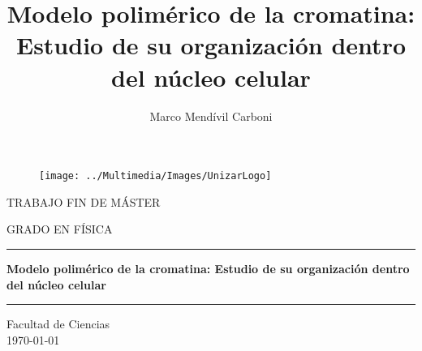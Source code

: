 \documentclass[a4paper,11pt]{report}
\title{Modelo polimérico de la cromatina: Estudio de su organización dentro del núcleo celular}
\author{Marco Mendívil Carboni}
\begin{document}
\renewcommand{\contentsname}{Índice}
\renewcommand{\tablename}{Tabla}
\renewcommand{\appendixname}{Anexo}


\begin{titlepage}

\vspace*{4mm}

\begin{figure}[h]
  \centering
  \texttt{[image: ../Multimedia/Images/UnizarLogo]}
\end{figure}

\vspace*{8mm}

\begin{center}
\Large TRABAJO FIN DE MÁSTER
\end{center}
\begin{center}
\Large GRADO EN FÍSICA
\end{center}

\vspace*{8mm}

\hrule

\vspace*{4mm}

\begin{center}
\huge\bf Modelo polimérico de la cromatina: Estudio de su organización dentro del núcleo celular
\end{center}

\vspace*{4mm}

\hrule

\vspace*{20mm}


\vspace*{8mm}


\vfill

\begin{center}
\large Facultad de Ciencias\\
\today\\
\end{center}

\end{titlepage}

\clearpage
\thispagestyle{empty}\hfill
\clearpage

\end{document}
